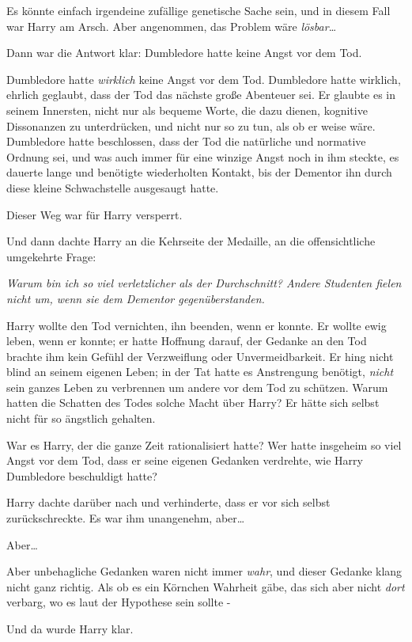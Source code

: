 {Es könnte einfach irgendeine zufällige genetische Sache sein, und in diesem Fall war Harry am Arsch. Aber angenommen, das Problem wäre \emph{lösbar}…

Dann war die Antwort klar: Dumbledore hatte keine Angst vor dem Tod.

Dumbledore hatte \emph{wirklich} keine Angst vor dem Tod. Dumbledore hatte wirklich, ehrlich geglaubt, dass der Tod das nächste große Abenteuer sei. Er glaubte es in seinem Innersten, nicht nur als bequeme Worte, die dazu dienen, kognitive Dissonanzen zu unterdrücken, und nicht nur so zu tun, als ob er weise wäre. Dumbledore hatte beschlossen, dass der Tod die natürliche und normative Ordnung sei, und was auch immer für eine winzige Angst noch in ihm steckte, es dauerte lange und benötigte wiederholten Kontakt, bis der Dementor ihn durch diese kleine Schwachstelle ausgesaugt hatte.

Dieser Weg war für Harry versperrt.

Und dann dachte Harry an die Kehrseite der Medaille, an die offensichtliche umgekehrte Frage:

\emph{Warum bin ich so viel verletzlicher als der Durchschnitt? Andere Studenten fielen nicht um, wenn sie dem Dementor gegenüberstanden.}

Harry wollte den Tod vernichten, ihn beenden, wenn er konnte. Er wollte ewig leben, wenn er konnte; er hatte Hoffnung darauf, der Gedanke an den Tod brachte ihm kein Gefühl der Verzweiflung oder Unvermeidbarkeit. Er hing nicht blind an seinem eigenen Leben; in der Tat hatte es Anstrengung benötigt, \emph{nicht} sein ganzes Leben zu verbrennen um andere vor dem Tod zu schützen. Warum hatten die Schatten des Todes solche Macht über Harry? Er hätte sich selbst nicht für so ängstlich gehalten.

War es Harry, der die ganze Zeit rationalisiert hatte? Wer hatte insgeheim so viel Angst vor dem Tod, dass er seine eigenen Gedanken verdrehte, wie Harry Dumbledore beschuldigt hatte?

Harry dachte darüber nach und verhinderte, dass er vor sich selbst zurückschreckte. Es war ihm unangenehm, aber…

Aber…

Aber unbehagliche Gedanken waren nicht immer \emph{wahr}, und dieser Gedanke klang nicht ganz richtig. Als ob es ein Körnchen Wahrheit gäbe, das sich aber nicht \emph{dort} verbarg, wo es laut der Hypothese sein sollte -

Und da wurde Harry klar.

}
